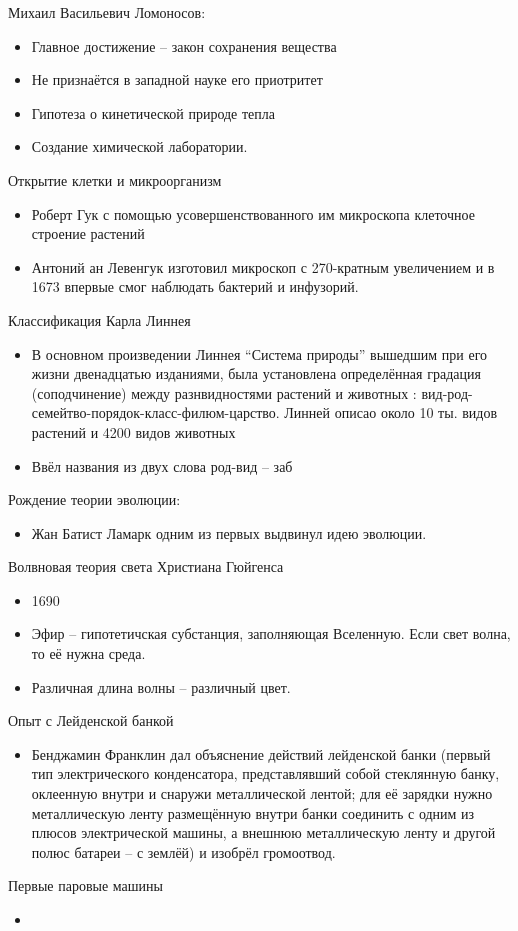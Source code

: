 \documentclass{book}
\theoremstyle{definition}
\begin{document}
    Михаил Васильевич Ломоносов:
    \begin{itemize}
        \item Главное достижение -- закон сохранения вещества
        \item Не признаётся в западной науке его приотритет
        \item Гипотеза о кинетической природе тепла
        \item Создание химической лаборатории.
    \end{itemize}

    Открытие клетки и микроорганизм
    \begin{itemize}
        \item  Роберт Гук с помощью усовершенствованного им микроскопа клеточное строение растений
        \item Антоний ан Левенгук изготовил микроскоп с 270-кратным увеличением и в 1673 впервые смог наблюдать бактерий и инфузорий.
    \end{itemize}

    Классификация Карла Линнея
    \begin{itemize}
        \item В основном произведении Линнея ``Система природы'' вышедшим при его жизни двенадцатью изданиями, была установлена определённая градация (соподчинение) между разнвидностями растений и животных : вид-род-семейтво-порядок-класс-филюм-царство. Линней описао около 10 ты. видов растений и 4200 видов животных
        \item Ввёл названия из двух слова род-вид -- заб
    \end{itemize}

    Рождение теории эволюции:
    \begin{itemize}
        \item   Жан Батист Ламарк одним из первых выдвинул идею эволюции.
    \end{itemize}

    Волвновая теория света Христиана Гюйгенса
    \begin{itemize}
        \item 1690
        \item Эфир -- гипотетичская субстанция, заполняющая Вселенную. Если свет волна, то её нужна среда.
        \item Различная длина волны -- различный цвет.
    \end{itemize}

    Опыт с Лейденской банкой
    \begin{itemize}
        \item Бенджамин Франклин дал объяснение действий лейденской банки (первый тип электрического конденсатора, представлявший собой стеклянную банку, оклеенную внутри и снаружи металлической лентой; для её зарядки нужно металлическую ленту размещённую внутри банки соединить с одним из плюсов электрической машины, а внешнюю металлическую ленту и другой полюс батареи -- с землёй) и изобрёл громоотвод.
    \end{itemize}

    Первые паровые машины
    \begin{itemize}
        \item 
    \end{itemize}
\end{document}
